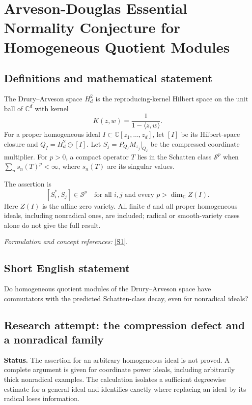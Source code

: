 \documentclass[11pt]{article}
\begin{document}
\section*{\texorpdfstring{Arveson-Douglas Essential Normality Conjecture for Homogeneous Quotient Modules}{Arveson-Douglas Essential Normality Conjecture for Homogeneous Quotient Modules}}\label{30006954}
\subsection{Definitions and mathematical statement}
The Drury--Arveson space $H_d^2$ is the reproducing-kernel Hilbert space on the unit ball of ${\mathbb{C}}^d$ with kernel
\[
 K(z,w)=\frac1{1-\langle z,w\rangle}.
\]
For a proper homogeneous ideal $I\subset{\mathbb{C}}[z_1,\ldots,z_d]$, let $[I]$ be its Hilbert-space closure and $Q_I=H_d^2\ominus[I]$. Let $S_j=P_{Q_I}M_{z_j}|_{Q_I}$ be the compressed coordinate multiplier. For $p>0$, a compact operator $T$ lies in the Schatten class $\mathcal S^p$ when $\sum_ns_n(T)^p<\infty$, where $s_n(T)$ are its singular values.

The assertion is
\[
 [S_i^*,S_j]\in\mathcal S^p
 \quad\text{for all }i,j\text{ and every }p>\dim_{{\mathbb{C}}} Z(I).
\]
Here $Z(I)$ is the affine zero variety. All finite $d$ and all proper homogeneous ideals, including nonradical ones, are included; radical or smooth-variety cases alone do not give the full result.
\par\smallskip\textit{Formulation and concept references:} \href{https://users.math.cas.cz/~englis/85.pdf}{[S1]}.

\subsection{Short English statement}
Do homogeneous quotient modules of the Drury--Arveson space have commutators with the predicted Schatten-class decay, even for nonradical ideals?
\subsection{Research attempt: the compression defect and a nonradical family}
\textbf{Status.} The assertion for an arbitrary homogeneous ideal is not proved. A complete argument is given for coordinate power ideals, including arbitrarily thick nonradical examples. The calculation isolates a sufficient degreewise estimate for a general ideal and identifies exactly where replacing an ideal by its radical loses information.
\end{document}
